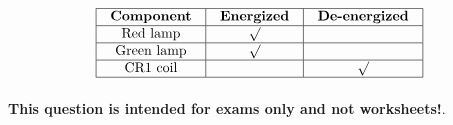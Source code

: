 $$\vbox{\offinterlineskip
\halign{\strut
\vrule \quad\hfil # \ \hfil & 
\vrule \quad\hfil # \ \hfil & 
\vrule \quad\hfil # \ \hfil \vrule \cr
\noalign{\hrule}
%
{\bf Component} & {\bf Energized} & {\bf De-energized} \cr
%
\noalign{\hrule}
%
Red lamp & $\surd$ &  \cr
%
\noalign{\hrule}
%
Green lamp & $\surd$ &  \cr
%
\noalign{\hrule}
%
CR1 coil &  & $\surd$ \cr
%
\noalign{\hrule}
} %
}$$ %








{\bf This question is intended for exams only and not worksheets!}.


